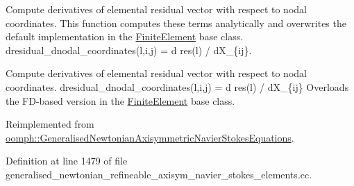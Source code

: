 Compute derivatives of elemental residual vector with respect to nodal coordinates. This function computes these terms analytically and overwrites the default implementation in the \hyperlink{classoomph_1_1FiniteElement}{Finite\+Element} base class. dresidual\+\_\+dnodal\+\_\+coordinates(l,i,j) = d res(l) / d\+X\+\_\+\{ij\}. 

Compute derivatives of elemental residual vector with respect to nodal coordinates. dresidual\+\_\+dnodal\+\_\+coordinates(l,i,j) = d res(l) / d\+X\+\_\+\{ij\} Overloads the F\+D-\/based version in the \hyperlink{classoomph_1_1FiniteElement}{Finite\+Element} base class. 

Reimplemented from \hyperlink{classoomph_1_1GeneralisedNewtonianAxisymmetricNavierStokesEquations_a741048e47acae2bdbda0cee6aaf0b4b0}{oomph\+::\+Generalised\+Newtonian\+Axisymmetric\+Navier\+Stokes\+Equations}.



Definition at line 1479 of file generalised\+\_\+newtonian\+\_\+refineable\+\_\+axisym\+\_\+navier\+\_\+stokes\+\_\+elements.\+cc.



